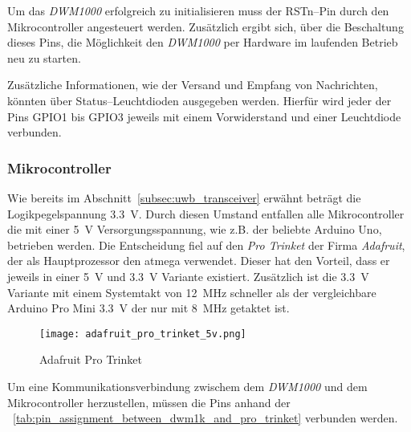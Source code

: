 Um das \textit{DWM1000} erfolgreich zu initialisieren muss der RSTn--Pin durch den Mikrocontroller angesteuert werden. Zusätzlich ergibt sich, über die Beschaltung dieses Pins, die Möglichkeit den \textit{DWM1000} per Hardware im laufenden Betrieb neu zu starten.

Zusätzliche Informationen, wie der Versand und Empfang von Nachrichten, könnten über Status--Leuchtdioden ausgegeben werden. Hierfür wird jeder der Pins GPIO1 bis GPIO3 jeweils mit einem Vorwiderstand und einer Leuchtdiode verbunden.


\begin{comment}
------------------------------------------------------------------------------------------
\end{comment}
\subsubsection{Mikrocontroller}

Wie bereits im Abschnitt~\ref{subsec:uwb_transceiver} erwähnt beträgt die Logikpegelspannung \SI{3.3}{\volt}. Durch diesen Umstand entfallen alle Mikrocontroller die mit einer \SI{5}{\volt} Versorgungsspannung, wie z.B. der beliebte Arduino Uno, betrieben werden. Die Entscheidung fiel auf den \textit{Pro Trinket} der Firma \textit{Adafruit}, der als Hauptprozessor den \Gls{atmega} verwendet. Dieser hat den Vorteil, dass er jeweils in einer \SI{5}{\volt} und \SI{3.3}{\volt} Variante existiert. Zusätzlich ist die \SI{3.3}{\volt} Variante mit einem Systemtakt von \SI{12}{\MHz} schneller als der vergleichbare Arduino Pro Mini \SI{3.3}{\volt} der nur mit \SI{8}{\MHz} getaktet ist.

\begin{figure}[!h]
	\centering
	\texttt{[image: adafruit\_pro\_trinket\_5v.png]}
	\caption[Adafruit Pro Trinket]{Adafruit Pro Trinket\protect\footnotemark}
	\label{fig:adafruit_pro_trinket}
\end{figure}


Um eine Kommunikationsverbindung zwischem dem \textit{DWM1000} und dem Mikrocontroller herzustellen, müssen die Pins anhand der \tablename~\ref{tab:pin_assignment_between_dwm1k_and_pro_trinket} verbunden werden.

